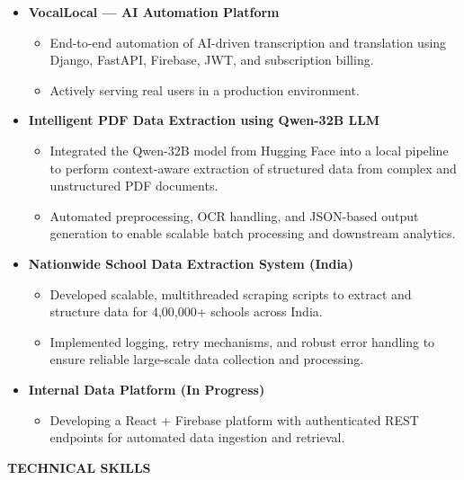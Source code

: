 \documentclass[a4paper,10pt]{article}
\newcommand{\resheading}[1]{{\small \colorbox{mygrey}{\begin{minipage}{0.975\textwidth}{\textbf{#1}}\end{minipage}}}}
\begin{document}
\begin{itemize}

\item {\bf VocalLocal — AI Automation Platform}
\begin{itemize}
\item End-to-end automation of AI-driven transcription and translation
using Django, FastAPI, Firebase, JWT, and subscription billing.
\item Actively serving real users in a production environment.
\end{itemize}
\item{\bf Intelligent PDF Data Extraction using Qwen-32B LLM}
\begin{itemize}
    \item Integrated the Qwen-32B model from Hugging Face into a local pipeline to perform context-aware extraction of structured data from complex and unstructured PDF documents.
    \item Automated preprocessing, OCR handling, and JSON-based output generation to enable scalable batch processing and downstream analytics.
\end{itemize}

\item {\bf Nationwide School Data Extraction System (India)}
\begin{itemize}
\item Developed scalable, multithreaded scraping scripts to extract and structure data for 4,00,000+ schools across India.
\item Implemented logging, retry mechanisms, and robust error handling to ensure reliable large-scale data collection and processing.
\end{itemize}

\item {\bf Internal Data Platform (In Progress)}
\begin{itemize}
\item Developing a React + Firebase platform with authenticated
REST endpoints for automated data ingestion and retrieval.
\end{itemize}

\end{itemize}

\resheading{\textbf{TECHNICAL SKILLS}}
\end{document}
